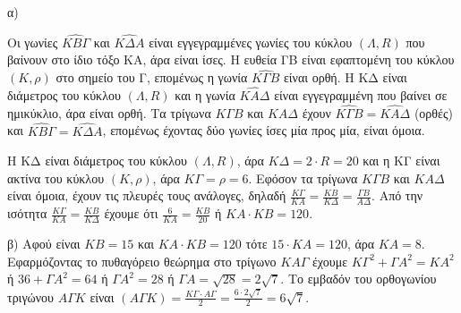 α)
\begin{rlist}
\item Οι γωνίες $\widehat{ΚΒ\Gamma}$ και $\widehat{Κ\Delta A}$ είναι εγγεγραμμένες γωνίες του κύκλου $(\Lambda,R)$ που βαίνουν στο ίδιο τόξο ΚΑ, άρα είναι ίσες. Η ευθεία ΓΒ είναι εφαπτομένη του κύκλου $(Κ,\rho)$ στο σημείο του Γ, επομένως η γωνία $\widehat{Κ\Gamma Β}$ είναι ορθή. Η ΚΔ είναι διάμετρος του κύκλου $(\Lambda,R)$ και η γωνία $\widehat{ΚΑ\Delta}$ είναι εγγεγραμμένη που βαίνει σε ημικύκλιο, άρα είναι ορθή.
Τα τρίγωνα $Κ\Gamma Β$ και $ΚΑ\Delta$ έχουν $\widehat{Κ\Gamma Β}= \widehat{ΚΑ\Delta}$ (ορθές) και $\widehat{ΚΒ\Gamma}= \widehat{Κ\Delta A}$, επομένως έχοντας δύο γωνίες ίσες μία προς μία, είναι όμοια.
\item Η ΚΔ είναι διάμετρος του κύκλου $(\Lambda,R)$, άρα $Κ\Delta=2 \cdot R=20$ και η ΚΓ είναι ακτίνα του κύκλου $(Κ,\rho)$, άρα $Κ\Gamma=\rho=6$. Εφόσον τα τρίγωνα $Κ\Gamma Β$ και $ΚΑ\Delta$ είναι όμοια, έχουν τις πλευρές τους ανάλογες, δηλαδή $\frac{Κ\Gamma}{ΚΑ}=\frac{ΚΒ}{Κ\Delta}=\frac{\Gamma Β}{Α\Delta}$. Από την ισότητα $\frac{Κ\Gamma}{ΚΑ}=\frac{ΚΒ}{Κ\Delta}$ έχουμε ότι $\frac{6}{ΚΑ}=\frac{ΚΒ}{20}$ ή $ΚΑ \cdot ΚΒ=120$.
\end{rlist}
β) Αφού είναι $ΚΒ=15$ και $ΚΑ \cdot ΚΒ=120$ τότε $15 \cdot ΚΑ=120$, άρα $ΚΑ=8$. Εφαρμόζοντας το πυθαγόρειο θεώρημα στο τρίγωνο $ΚΑ\Gamma$ έχουμε $Κ\Gamma^2+\Gamma Α^2=ΚΑ^2$ ή $36+ \Gamma Α^2=64$ ή $\Gamma Α^2=28$ ή $\Gamma Α=\sqrt{28}=2\sqrt{7}$. Το εμβαδόν του ορθογωνίου τριγώνου $Α\Gamma Κ$ είναι $(Α\Gamma Κ)=\frac{Κ\Gamma \cdot Α\Gamma}{2}=\frac{6 \cdot 2\sqrt{7}}{2}=6\sqrt{7}$.